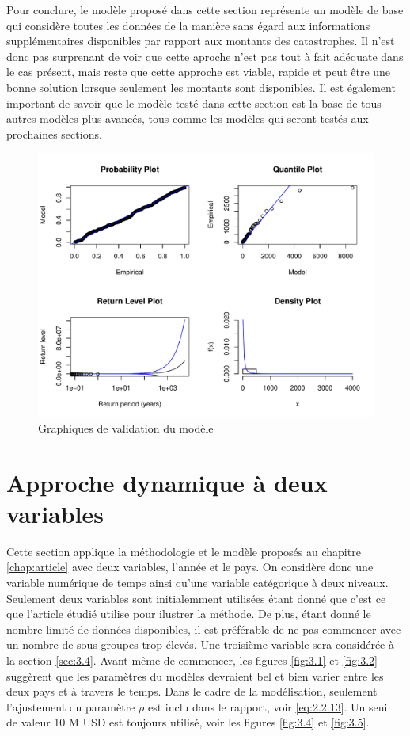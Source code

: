 Pour conclure, le modèle proposé dans cette section représente un modèle de base qui considère toutes les données de la manière sans égard aux informations supplémentaires disponibles par rapport aux montants des catastrophes. Il n'est donc pas surprenant de voir que cette aproche n'est pas tout à fait adéquate dans le cas présent, mais reste que cette approche est viable, rapide et peut être une bonne solution lorsque seulement les montants sont disponibles. Il est également important de savoir que le modèle testé dans cette section est la base de tous autres modèles plus avancés, tous comme les modèles qui seront testés aux prochaines sections.
\begin{figure}[h]
\begin{center}
\includegraphics{images/fig-011}
\end{center}
\caption{Graphiques de validation du modèle}
\label{fig:3.6}
\end{figure}


\clearpage
\section{Approche dynamique à deux variables}
\label{sec:3.3}

Cette section applique la méthodologie et le modèle proposés au chapitre \ref{chap:article} avec deux variables, l'année et le pays. On considère donc une variable numérique de temps ainsi qu'une variable catégorique à deux niveaux. Seulement deux variables sont initialemment utilisées étant donné que c'est ce que l'article étudié utilise pour ilustrer la méthode. De plus, étant donné le nombre limité de données disponibles, il est préférable de ne pas commencer avec un nombre de sous-groupes trop élevés. Une troisième variable sera considérée à la section \ref{sec:3.4}. Avant même de commencer, les figures \ref{fig:3.1} et \ref{fig:3.2} suggèrent que les paramètres du modèles devraient bel et bien varier entre les deux pays et à travers le temps. Dans le cadre de la modélisation, seulement l'ajustement du paramètre $\rho$ est inclu dans le rapport, voir \ref{eq:2.2.13}. Un seuil de valeur 10 M USD est toujours utilisé, voir les figures \ref{fig:3.4} et \ref{fig:3.5}. 
\\

